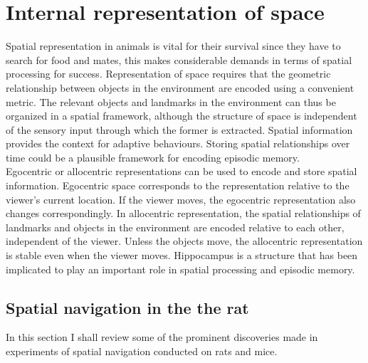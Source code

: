 \section{Internal representation of space} 

\label{space} 


Spatial representation in animals is vital for their survival since they have to search for food and mates, this makes considerable demands in terms of spatial processing for success. Representation of space requires that the geometric relationship between objects in the environment are encoded using a convenient metric. The relevant objects and landmarks in the environment can thus be organized in a spatial framework, although the structure of space is independent of the sensory input through which the former is extracted. Spatial information provides the context for adaptive behaviours. Storing spatial relationships over time could be a plausible framework for encoding episodic memory. \\
Egocentric or allocentric representations can be used to encode and store spatial information. Egocentric space corresponds to the representation relative to the viewer's current location. If the viewer moves, the egocentric representation also changes correspondingly. In allocentric representation, the spatial relationships of landmarks and objects in the environment are encoded relative to each other, independent of the viewer. Unless the objects move, the allocentric representation is stable even when the viewer moves. Hippocampus is a structure that has been implicated to play an important role in spatial processing and episodic memory. 

\subsection{Spatial navigation in the the rat}
In this section I shall review some of the prominent discoveries made in experiments of spatial navigation conducted on rats and mice.

